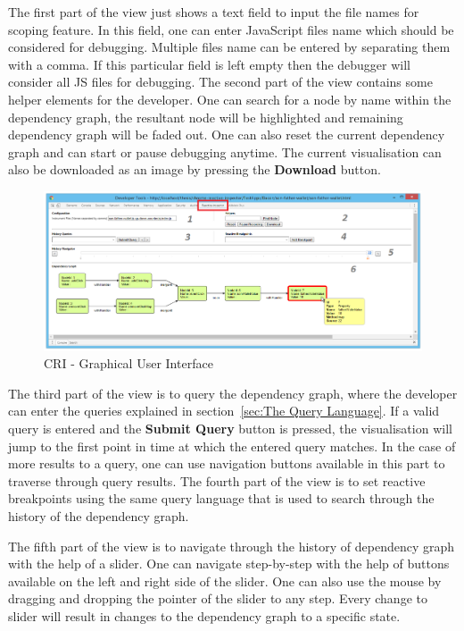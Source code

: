 The first part of the view just shows a text field to input the file names for scoping feature. In this field, one can enter JavaScript files name which should be considered for debugging. Multiple files name can be entered by separating them with a comma. If this particular field is left empty then the debugger will consider all JS files for debugging. The second part of the view contains some helper elements for the developer. One can search for a node by name within the dependency graph, the resultant node will be highlighted and remaining dependency graph will be faded out. One can also reset the current dependency graph and can start or pause debugging anytime. The current visualisation can also be downloaded as an image by pressing the \textbf{Download} button.


\begin{figure}[!h]
	\centering
	\includegraphics[scale=0.5,trim=0 0 0 0]{gfx/CRI-GUI.png}
	\caption{CRI - Graphical User Interface}
	\label{fig:system_implementation_detail}
\end{figure}

The third part of the view is to query the dependency graph, where
the developer can enter the queries explained in section~\ref{sec:The Query Language}. If a valid query is entered and the \textbf{Submit Query} button is pressed, the visualisation will jump to the first point in time at which the entered query matches. In the case of more results to a query, one can use navigation buttons available in this part to traverse through query results. The fourth part of the view is to set reactive breakpoints using the same query language that is used to search through the history of the dependency graph. 

The fifth part of the view is to navigate through the history of dependency graph with the help of a slider. One can navigate step-by-step with the help of buttons available on the left and right side of the slider. One can also use the mouse by dragging and dropping the pointer of the slider to any step. Every change to slider will result in changes to the dependency graph to a specific state. 

